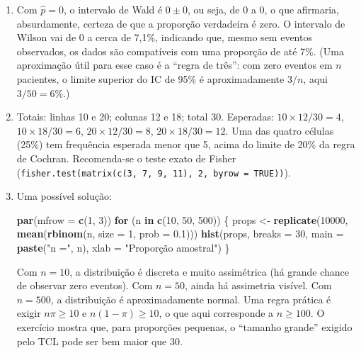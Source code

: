 \documentclass[
]{book}
\newenvironment{Shaded}{\begin{snugshade}}{\end{snugshade}}
\newcommand{\AttributeTok}[1]{\textcolor[rgb]{0.13,0.29,0.53}{#1}}
\newcommand{\ControlFlowTok}[1]{\textcolor[rgb]{0.13,0.29,0.53}{\textbf{#1}}}
\newcommand{\DecValTok}[1]{\textcolor[rgb]{0.00,0.00,0.81}{#1}}
\newcommand{\FloatTok}[1]{\textcolor[rgb]{0.00,0.00,0.81}{#1}}
\newcommand{\FunctionTok}[1]{\textcolor[rgb]{0.13,0.29,0.53}{\textbf{#1}}}
\newcommand{\NormalTok}[1]{#1}
\newcommand{\OtherTok}[1]{\textcolor[rgb]{0.56,0.35,0.01}{#1}}
\newcommand{\StringTok}[1]{\textcolor[rgb]{0.31,0.60,0.02}{#1}}
\begin{document}
\begin{enumerate}
\item
  Com \(\hat{p} = 0\), o intervalo de Wald é \(0 \pm 0\), ou seja, de 0 a 0, o que afirmaria, absurdamente, certeza de que a proporção verdadeira é zero. O intervalo de Wilson vai de 0 a cerca de 7,1\%, indicando que, mesmo sem eventos observados, os dados são compatíveis com uma proporção de até 7\%. (Uma aproximação útil para esse caso é a ``regra de três'': com zero eventos em \(n\) pacientes, o limite superior do IC de 95\% é aproximadamente \(3/n\), aqui \(3/50 = 6\%\).)
\item
  Totais: linhas 10 e 20; colunas 12 e 18; total 30. Esperadas: \(10 \times 12/30 = 4\), \(10 \times 18/30 = 6\), \(20 \times 12/30 = 8\), \(20 \times 18/30 = 12\). Uma das quatro células (25\%) tem frequência esperada menor que 5, acima do limite de 20\% da regra de Cochran. Recomenda-se o teste exato de Fisher (\texttt{fisher.test(matrix(c(3,\ 7,\ 9,\ 11),\ 2,\ byrow\ =\ TRUE))}).
\item
  Uma possível solução:

\begin{Shaded}
\begin{Highlighting}[]
\FunctionTok{par}\NormalTok{(}\AttributeTok{mfrow =} \FunctionTok{c}\NormalTok{(}\DecValTok{1}\NormalTok{, }\DecValTok{3}\NormalTok{))}
\ControlFlowTok{for}\NormalTok{ (n }\ControlFlowTok{in} \FunctionTok{c}\NormalTok{(}\DecValTok{10}\NormalTok{, }\DecValTok{50}\NormalTok{, }\DecValTok{500}\NormalTok{)) \{}
\NormalTok{  props }\OtherTok{\textless{}{-}} \FunctionTok{replicate}\NormalTok{(}\DecValTok{10000}\NormalTok{, }\FunctionTok{mean}\NormalTok{(}\FunctionTok{rbinom}\NormalTok{(n, }\AttributeTok{size =} \DecValTok{1}\NormalTok{, }\AttributeTok{prob =} \FloatTok{0.1}\NormalTok{)))}
  \FunctionTok{hist}\NormalTok{(props, }\AttributeTok{breaks =} \DecValTok{30}\NormalTok{, }\AttributeTok{main =} \FunctionTok{paste}\NormalTok{(}\StringTok{"n ="}\NormalTok{, n), }\AttributeTok{xlab =} \StringTok{"Proporção amostral"}\NormalTok{)}
\NormalTok{\}}
\end{Highlighting}
\end{Shaded}

  Com \(n = 10\), a distribuição é discreta e muito assimétrica (há grande chance de observar zero eventos). Com \(n = 50\), ainda há assimetria visível. Com \(n = 500\), a distribuição é aproximadamente normal. Uma regra prática é exigir \(n\pi \ge 10\) e \(n(1-\pi) \ge 10\), o que aqui corresponde a \(n \ge 100\). O exercício mostra que, para proporções pequenas, o ``tamanho grande'' exigido pelo TCL pode ser bem maior que 30.
\end{enumerate}
\end{document}
